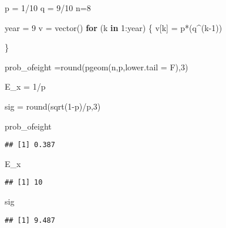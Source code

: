 \documentclass[
]{article}
\newenvironment{Shaded}{\begin{snugshade}}{\end{snugshade}}
\newcommand{\AttributeTok}[1]{\textcolor[rgb]{0.77,0.63,0.00}{#1}}
\newcommand{\ControlFlowTok}[1]{\textcolor[rgb]{0.13,0.29,0.53}{\textbf{#1}}}
\newcommand{\DecValTok}[1]{\textcolor[rgb]{0.00,0.00,0.81}{#1}}
\newcommand{\FunctionTok}[1]{\textcolor[rgb]{0.00,0.00,0.00}{#1}}
\newcommand{\NormalTok}[1]{#1}
\newcommand{\OtherTok}[1]{\textcolor[rgb]{0.56,0.35,0.01}{#1}}
\newcommand{\SpecialCharTok}[1]{\textcolor[rgb]{0.00,0.00,0.00}{#1}}
\begin{document}
\begin{Shaded}
\begin{Highlighting}[]
\NormalTok{p }\OtherTok{=} \DecValTok{1}\SpecialCharTok{/}\DecValTok{10}
\NormalTok{q }\OtherTok{=} \DecValTok{9}\SpecialCharTok{/}\DecValTok{10}
\NormalTok{n}\OtherTok{=}\DecValTok{8}

\NormalTok{year }\OtherTok{=} \DecValTok{9}
\NormalTok{v }\OtherTok{=} \FunctionTok{vector}\NormalTok{()}
\ControlFlowTok{for}\NormalTok{ (k }\ControlFlowTok{in} \DecValTok{1}\SpecialCharTok{:}\NormalTok{year) \{}
\NormalTok{ v[k] }\OtherTok{=}\NormalTok{ p}\SpecialCharTok{*}\NormalTok{(q}\SpecialCharTok{\^{}}\NormalTok{(k}\DecValTok{{-}1}\NormalTok{))}
 
\NormalTok{\}}

\NormalTok{prob\_ofeight }\OtherTok{=}\FunctionTok{round}\NormalTok{(}\FunctionTok{pgeom}\NormalTok{(n,p,}\AttributeTok{lower.tail =}\NormalTok{ F),}\DecValTok{3}\NormalTok{)}

\NormalTok{E\_x }\OtherTok{=} \DecValTok{1}\SpecialCharTok{/}\NormalTok{p}

\NormalTok{sig }\OtherTok{=} \FunctionTok{round}\NormalTok{(}\FunctionTok{sqrt}\NormalTok{(}\DecValTok{1}\SpecialCharTok{{-}}\NormalTok{p)}\SpecialCharTok{/}\NormalTok{p,}\DecValTok{3}\NormalTok{)}

\NormalTok{prob\_ofeight}
\end{Highlighting}
\end{Shaded}

\begin{verbatim}
## [1] 0.387
\end{verbatim}

\begin{Shaded}
\begin{Highlighting}[]
\NormalTok{E\_x}
\end{Highlighting}
\end{Shaded}

\begin{verbatim}
## [1] 10
\end{verbatim}

\begin{Shaded}
\begin{Highlighting}[]
\NormalTok{sig}
\end{Highlighting}
\end{Shaded}

\begin{verbatim}
## [1] 9.487
\end{verbatim}
\end{document}
